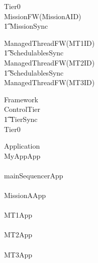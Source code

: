 \begin{circus}
\circprocess Tier0 \circdef \\

\circblockopen
	MissionFW(MissionAID)\\
		\t1 	\lpar MissionSync \rpar \\
		\circblockopen



			ManagedThreadFW(MT1ID)\\
			\t1 \lpar SchedulablesSync \rpar\\
			ManagedThreadFW(MT2ID)\\
			\circblockclose
			\circblockopen
			\t1 \lpar SchedulablesSync \rpar\\
			ManagedThreadFW(MT3ID)\\








		\circblockclose
\circblockclose
\end{circus}
%
%
%
\begin{circus}
\circprocess Framework \circdef \\
\circblockopen
ControlTier \\
\t1 \lpar TierSync \rpar \\
 \circblockopen
Tier0
\circblockclose
\circblockclose
\end{circus}
%
%
\begin{circus}
\circprocess  Application \circdef \\
\circblockopen
MyAppApp\\
\interleave\\
mainSequencerApp\\
\interleave \\
		MissionAApp\\
		\interleave \\
			MT1App\\
			\interleave \\
			MT2App\\
			\interleave \\
			MT3App\\
			
		
\circblockclose
\end{circus}
